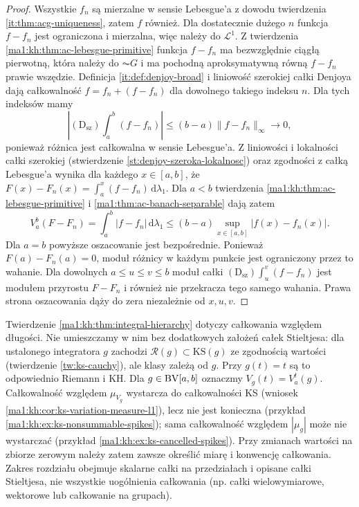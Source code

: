 \begin{proof}
Wszystkie $f_n$ są mierzalne w sensie Lebesgue'a z dowodu twierdzenia \ref{it:thm:acg-uniqueness}, zatem $f$ również. Dla dostatecznie dużego $n$ funkcja $f-f_n$ jest ograniczona i mierzalna, więc należy do $\mathcal L^1$. Z twierdzenia \ref{ma1:kh:thm:ac-lebesgue-primitive} funkcja $f-f_n$ ma bezwzględnie ciągłą pierwotną, która należy do $\AC G$ i ma pochodną aproksymatywną równą $f-f_n$ prawie wszędzie. Definicja \ref{it:def:denjoy-broad} i liniowość szerokiej
całki Denjoya dają całkowalność $f=f_n+(f-f_n)$
dla dowolnego takiego indeksu $n$. Dla tych indeksów mamy
\[
 \left|(\mathrm D_{\mathrm{sz}})\int_a^b(f-f_n)\right|
 \le (b-a)\|f-f_n\|_\infty\longrightarrow0,
\]
ponieważ różnica jest całkowalna w sensie Lebesgue'a.
Z liniowości i lokalności całki szerokiej
(stwierdzenie \ref{st:denjoy-szeroka-lokalnosc})
oraz zgodności z całką Lebesgue'a wynika
dla każdego $x\in[a,b]$,
że $F(x)-F_n(x)=\int_a^x(f-f_n)\,\mathrm d\lambda_1$.
Dla $a<b$ twierdzenia \ref{ma1:kh:thm:ac-lebesgue-primitive}
i \ref{ma1:thm:ac-banach-separable} dają zatem
\[
 V_a^b(F-F_n)=\int_a^b|f-f_n|\,\mathrm d\lambda_1
 \le(b-a)\sup_{x\in[a,b]}|f(x)-f_n(x)|.
\]
Dla $a=b$ powyższe oszacowanie jest bezpośrednie.
Ponieważ $F(a)-F_n(a)=0$, moduł różnicy w każdym
punkcie jest ograniczony przez to wahanie.
Dla dowolnych $a\le u\le v\le b$ moduł całki
$(\mathrm D_{\mathrm{sz}})\int_u^v(f-f_n)$ jest
modułem przyrostu $F-F_n$ i również nie przekracza
tego samego wahania. Prawa strona oszacowania dąży
do zera niezależnie od $x,u,v$.
\end{proof}
\begin{uwaga}
Twierdzenie \ref{ma1:kh:thm:integral-hierarchy} dotyczy całkowania względem długości. Nie umieszczamy w nim bez dodatkowych założeń całek Stieltjesa: dla ustalonego integratora $g$ zachodzi $\mathcal R(g)\subset\mathrm{KS}(g)$ ze zgodnością wartości (twierdzenie \ref{tw:ks-cauchy}), ale klasy zależą od $g$. Przy $g(t)=t$ są to odpowiednio Riemann i KH. Dla $g\in\mathrm{BV}[a,b]$ oznaczmy $V_g(t)=V_a^t(g)$.
Całkowalność względem $\mu_{V_g}$ wystarcza do całkowalności KS (wniosek \ref{ma1:kh:cor:ks-variation-measure-l1}), lecz nie jest konieczna (przykład \ref{ma1:kh:ex:ks-nonsummable-spikes}); sama całkowalność względem $|\mu_g|$ może nie wystarczać (przykład \ref{ma1:kh:ex:ks-cancelled-spikes}). Przy zmianach wartości na zbiorze zerowym należy zatem zawsze określić miarę i konwencję całkowania. Zakres rozdziału obejmuje skalarne całki na przedziałach i opisane całki Stieltjesa, nie wszystkie uogólnienia całkowania (np. całki wielowymiarowe, wektorowe lub całkowanie na grupach).
\end{uwaga}

